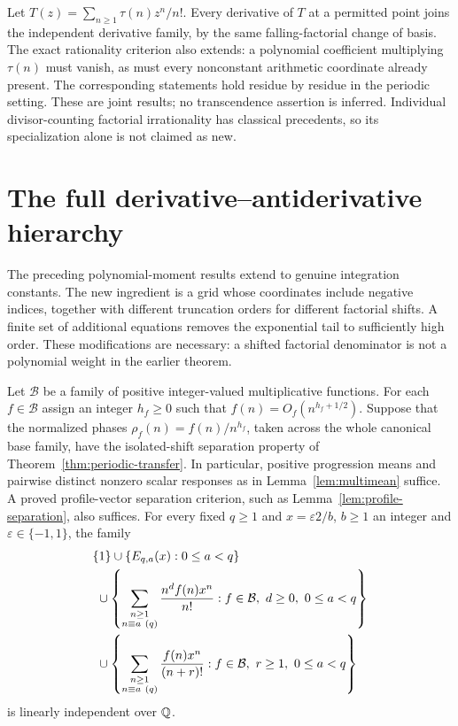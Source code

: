 Let $T(z)=\sum_{n\geq1}\tau(n)z^n/n!$. Every derivative of $T$ at a
permitted point joins the independent derivative family, by the same
falling-factorial change of basis. The exact rationality criterion also
extends: a polynomial coefficient multiplying $\tau(n)$ must vanish,
as must every nonconstant arithmetic coordinate already present.
The corresponding statements hold residue by residue in the periodic
setting. These are joint results; no transcendence assertion is inferred.
Individual divisor-counting factorial irrationality has classical
precedents, so its specialization alone is not claimed as new.


\clearpage
\section{The full derivative--antiderivative hierarchy}
\label{sec:antiderivatives}

The preceding polynomial-moment results extend to genuine integration
constants.  The new ingredient is a grid whose coordinates include negative
indices, together with different truncation orders for different factorial
shifts.  A finite set of additional equations removes the exponential tail
to sufficiently high order.  These modifications are necessary: a shifted
factorial denominator is not a polynomial weight in the earlier theorem.

\begin{theorem}
\label{thm:two-sided}
Let $\mathcal B$ be a family of positive integer-valued multiplicative
functions.  For each $f\in\mathcal B$ assign an integer $h_f\geq0$ such that
$f(n)=O_f(n^{h_f+1/2})$.  Suppose that the normalized phases
$\rho_f(n)=f(n)/n^{h_f}$, taken across the whole canonical base family,
have the isolated-shift separation property of
Theorem~\ref{thm:periodic-transfer}.  In particular, positive progression
means and pairwise distinct nonzero scalar responses as in
Lemma~\ref{lem:multimean} suffice.  A proved profile-vector separation
criterion, such as Lemma~\ref{lem:profile-separation}, also suffices.
For every fixed $q\geq1$ and $x=\varepsilon2/b$, $b\geq1$ an integer and
$\varepsilon\in\{-1,1\}$, the family
\begin{align}
 &\{1\}\cup\{E_{q,a}(x):0\leq a<q\}\notag\\
 &\ \cup\left\{\sum_{\substack{n\geq1\\n\equiv a\ (q)}}
                 \frac{n^d f(n)x^n}{n!}:
                 f\in\mathcal B,\ d\geq0,\ 0\leq a<q\right\}\notag\\
 &\ \cup\left\{\sum_{\substack{n\geq1\\n\equiv a\ (q)}}
                 \frac{f(n)x^n}{(n+r)!}:
                 f\in\mathcal B,\ r\geq1,\ 0\leq a<q\right\}
 \label{eq:two-sided-family}
\end{align}
is linearly independent over $\mathbb Q$.
\end{theorem}

